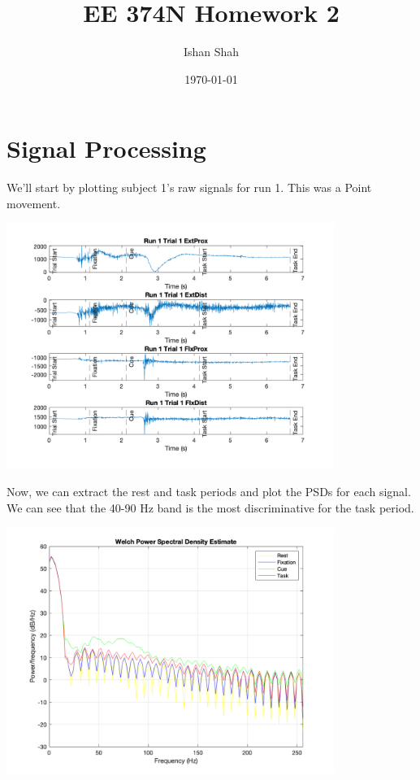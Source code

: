 \documentclass[12pt]{article}
\begin{document}
\title{EE 374N Homework 2}
\author{Ishan Shah}
\date{\today}
\maketitle

\section{Signal Processing}
We'll start by plotting subject 1's raw signals for run 1. This was a Point movement.

\begin{center}
    \includegraphics[width=0.8\textwidth]{raw_signals.png}
\end{center}

Now, we can extract the rest and task periods and plot the PSDs for each signal. We can see that the 40-90 Hz band is the most discriminative for the task period.

\begin{center}
    \includegraphics[width=0.8\textwidth]{raw_welch.png}
\end{center}
\end{document}
